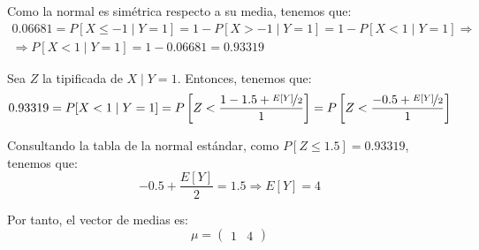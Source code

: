 \begin{ejercicio}
    Como la normal es simétrica respecto a su media, tenemos que:
    \begin{multline*}
        0.06681 = P[X\leq -1\mid Y=1] = 1-P[X> -1\mid Y=1] = 1-P[X<1\mid Y=1]
        \Longrightarrow \\ \Longrightarrow P[X<1\mid Y=1] = 1-0.06681 = 0.93319
    \end{multline*}

    Sea $Z$ la tipificada de $X\mid Y=1$. Entonces, tenemos que:
    \begin{equation*}
        0.93319 = P[X<1\mid Y=1] = P\left[Z< \frac{1-1.5+\nicefrac{E[Y]}{2}}{1}\right] = 
        P\left[Z< \frac{-0.5+\nicefrac{E[Y]}{2}}{1}\right]
    \end{equation*}

    Consultando la tabla de la normal estándar, como $P[Z\leq 1.5]=0.93319$, tenemos que:
    \begin{equation*}
        -0.5+\frac{E[Y]}{2} = 1.5 \Longrightarrow E[Y] = 4
    \end{equation*}

    Por tanto, el vector de medias es:
    \begin{equation*}
        \mu = \begin{pmatrix}
            1&
            4
        \end{pmatrix}
    \end{equation*}
\end{ejercicio}